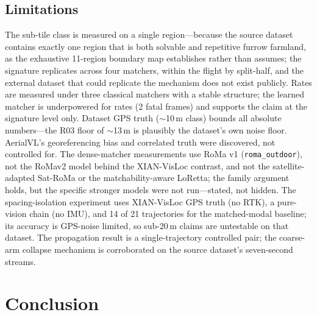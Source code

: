 \documentclass[journal]{IEEEtran}
\begin{document}
\subsection{Limitations}
The sub-tile class is measured on a single region---because the source dataset contains exactly one region that is both solvable and repetitive furrow farmland, as the exhaustive 11-region boundary map establishes rather than assumes; the signature replicates across four matchers, within the flight by split-half, and the external dataset that could replicate the mechanism does not exist publicly. Rates are measured under three classical matchers with a stable structure; the learned matcher is underpowered for rates (2 fatal frames) and supports the claim at the signature level only. Dataset GPS truth ($\sim$10\,m class) bounds all absolute numbers---the R03 floor of $\sim$13\,m is plausibly the dataset's own noise floor. AerialVL's georeferencing bias and correlated truth were discovered, not controlled for. The dense-matcher measurements use RoMa v1 (\texttt{roma\_outdoor}), not the RoMav2 model behind the XIAN-VisLoc contrast, and not the satellite-adapted Sat-RoMa or the matchability-aware LoRetta; the family argument holds, but the specific stronger models were not run---stated, not hidden. The spacing-isolation experiment uses XIAN-VisLoc GPS truth (no RTK), a pure-vision chain (no IMU), and 14 of 21 trajectories for the matched-modal baseline; its accuracy is GPS-noise limited, so sub-20\,m claims are untestable on that dataset. The propagation result is a single-trajectory controlled pair; the coarse-arm collapse mechanism is corroborated on the source dataset's seven-second streams.

\section{Conclusion}
\end{document}
